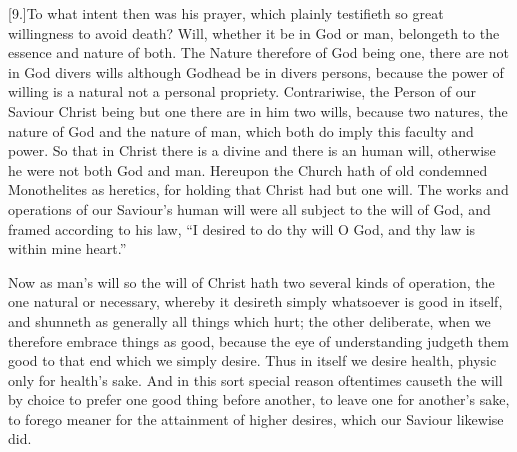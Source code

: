 [9.]To what intent then was his prayer, which plainly testifieth so great willingness to avoid death? Will, whether it be in God or man, belongeth to the essence and nature of both. The Nature therefore of God being one, there are not in God divers wills although Godhead be in divers persons, because the power of willing is a natural not a personal propriety. Contrariwise, the Person of our Saviour Christ being but one there are in him two wills, because two natures, the nature of God and the nature of man, which both do imply this faculty and power. So that in Christ there is a divine and there is an human will, otherwise he were not both God and man. Hereupon the Church hath of old condemned Monothelites as heretics, for holding that Christ had but one will. The works and operations of our Saviour’s human will were all subject to the will of God, and framed according to his law, “I desired to do thy will O God, and thy law is within mine heart.”



Now as man’s will so the will of Christ hath two several kinds of operation, the one natural or necessary, whereby it desireth simply whatsoever is good in itself, and shunneth as generally all things which hurt; the other deliberate, when we therefore embrace things as good, because the eye of understanding judgeth them good to that end which we simply desire. Thus in itself we desire health, physic only for health’s sake. And in this sort special reason oftentimes causeth the will by choice to prefer one good thing before another, to leave one for another’s sake, to forego meaner for the attainment of higher desires, which our Saviour likewise did.

